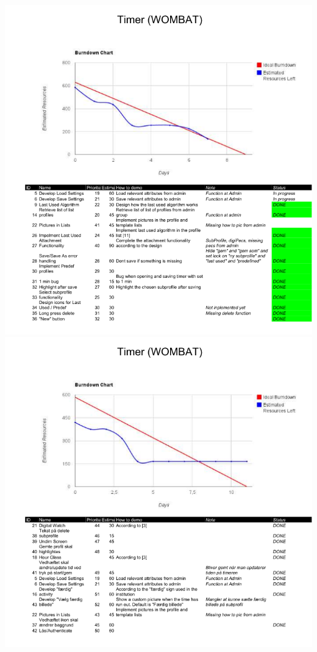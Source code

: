 \begin{center}
		\includegraphics[width=\textwidth]{Development/burndown_charts/Sprint_3.png}
		\includegraphics[width=\textwidth]{Development/burndown_charts/Sprint_4.png}

\end{center}
